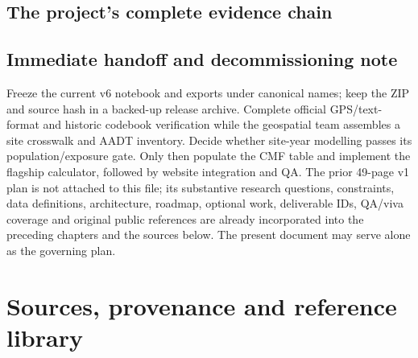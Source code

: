 \documentclass[11pt,a4paper,openany]{report}
\begin{document}
\section{The project's complete evidence chain}
\begin{center}
\end{center}

\section{Immediate handoff and decommissioning note}
Freeze the current v6 notebook and exports under canonical names; keep the ZIP and source hash in a backed-up release archive. Complete official GPS/text-format and historic codebook verification while the geospatial team assembles a site crosswalk and AADT inventory. Decide whether site-year modelling passes its population/exposure gate. Only then populate the CMF table and implement the flagship calculator, followed by website integration and QA. The prior 49-page v1 plan is not attached to this file; its substantive research questions, constraints, data definitions, architecture, roadmap, optional work, deliverable IDs, QA/viva coverage and original public references are already incorporated into the preceding chapters and the sources below. The present document may serve alone as the governing plan.

\appendix
\chapter{Sources, provenance and reference library}
\end{document}
